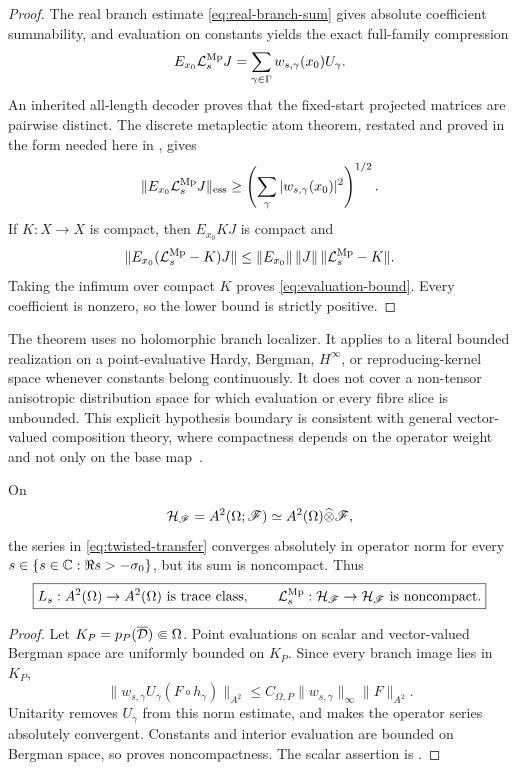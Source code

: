 \begin{proof}
The real branch estimate \eqref{eq:real-branch-sum} gives absolute
coefficient summability, and evaluation on constants yields the exact
full-family compression
\begin{equation}
 E_{x_0}\mathcal{L}_s^{\rm Mp}J
 =\sum_{\gamma\in\Gamma}w_{s,\gamma}(x_0)U_\gamma.
 \label{eq:fibre-compression}
\end{equation}
An inherited all-length decoder proves that the fixed-start projected
matrices are pairwise distinct.  The discrete metaplectic atom theorem,
restated and proved in the form needed here in
, gives
\[
 \|E_{x_0}\mathcal{L}_s^{\rm Mp}J\|_{\mathrm{ess}}
 \geq
 \left(\sum_\gamma|w_{s,\gamma}(x_0)|^2\right)^{1/2}.
\]
If \(K:X\to X\) is compact, then \(E_{x_0}KJ\) is compact and
\[
 \|E_{x_0}(\mathcal{L}_s^{\rm Mp}-K)J\|
 \leq\|E_{x_0}\|\,\|J\|\,
 \|\mathcal{L}_s^{\rm Mp}-K\|.
\]
Taking the infimum over compact \(K\) proves
\eqref{eq:evaluation-bound}.  Every coefficient is nonzero, so the lower
bound is strictly positive.
\end{proof}

The theorem uses no holomorphic branch localizer.  It applies to a literal
bounded realization on a point-evaluative Hardy, Bergman,
\(H^\infty\), or reproducing-kernel space whenever constants belong
continuously.  It does not cover a non-tensor anisotropic distribution space
for which evaluation or every fibre slice is unbounded.  This explicit
hypothesis boundary is consistent with general vector-valued composition
theory, where compactness depends on the operator weight and not only on the
base map~\citep{bonet2012}.

\begin{theorem}
\label{thm:same-domain}
On
\[
 \mathcal{H}_{\mathscr{F}}=A^2(\Omega;\mathscr{F})
 \simeq A^2(\Omega)\widehat\otimes\mathscr{F},
\]
the series in \eqref{eq:twisted-transfer} converges absolutely in operator
norm for every \(s\in\{s\in\mathbb{C}:\Re s>-\sigma_0\}\), but its sum is noncompact.  Thus
\begin{equation}
 \boxed{
 L_s:A^2(\Omega)\to A^2(\Omega)
 \text{ is trace class},\qquad
 \mathcal{L}_s^{\rm Mp}:\mathcal{H}_{\mathscr{F}}\to\mathcal{H}_{\mathscr{F}}
 \text{ is noncompact}.}
 \label{eq:same-domain-dichotomy}
\end{equation}
\end{theorem}

\begin{proof}
Let \(K_P=p_P(\overline{\mathcal{D}})\Subset\Omega\).  Point evaluations on scalar
and vector-valued Bergman space are uniformly bounded on \(K_P\).  Since
every branch image lies in \(K_P\),
\[
 \|w_{s,\gamma}U_\gamma(F\circ h_\gamma)\|_{A^2}
 \leq C_{\Omega,P}\|w_{s,\gamma}\|_\infty
 \|F\|_{A^2}.
\]
Unitarity removes \(U_\gamma\) from this norm estimate, and
 makes the operator series absolutely
convergent.  Constants and interior evaluation are bounded on Bergman space,
so  proves noncompactness.  The scalar assertion
is .
\end{proof}

